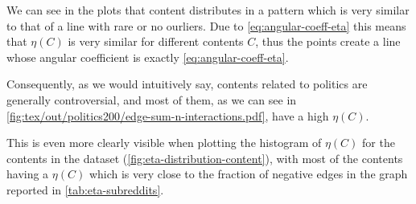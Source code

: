 We can see in the plots that content distributes in a pattern which is very
similar to that of a line with rare or no ourliers. Due to
\eqref{eq:angular-coeff-eta} this means that $\eta(C)$ is very similar for
different contents $C$, thus the points create a line whose angular coefficient
is exactly \eqref{eq:angular-coeff-eta}.

Consequently, as we would intuitively say, contents related
to politics are generally controversial, and most of them, as we can see
in \autoref{fig:tex/out/politics200/edge-sum-n-interactions.pdf}, have a high
$\eta(C)$.

This is even more clearly visible when plotting the histogram of $\eta(C)$ for the contents in the dataset
(\autoref{fig:eta-distribution-content}), with most of the contents having a
$\eta(C)$ which is very close to the fraction of negative edges in the graph
reported in \autoref{tab:eta-subreddits}.

